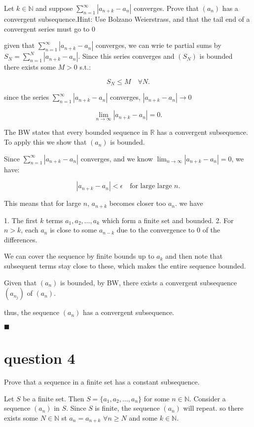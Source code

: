 \documentclass{article}
\begin{document}
Let $k \in \mathbb{N}$ and suppose $\sum_{n=1}^{\infty} |a_{n+k} - a_n|$ converges. Prove that $(a_n)$ has a convergent subsequence.Hint: Use Bolzano Weierstrass,
and that the tail end of a convergent series must go to 0

given that $\sum_{n=1}^{\infty} |a_{n+k} - a_n|$ converges, we can wrie te partial sums by $S_N = \sum_{n=1}^{N} |a_{n+k} - a_n|$. Since this series converges and $(S_N)$ is bounded\\ there exists some $M > 0$ s.t.:

\[
S_N \leq M \quad \forall N.
\]

since the series $\sum_{n=1}^{\infty} |a_{n+k} - a_n|$ converges, $|a_{n+k} - a_n| \to 0$

\[
\lim_{n \to \infty} |a_{n+k} - a_n| = 0.
\]

The BW states that every bounded sequence in $\mathbb{R}$ has a convergent subsequence. To apply this we show that $(a_n)$ is bounded.

Since $\sum_{n=1}^{\infty} |a_{n+k} - a_n|$ converges, and we know $\lim_{n \to \infty} |a_{n+k} - a_n| = 0$, we have:

\[
|a_{n+k} - a_n| < \epsilon \quad \text{for large large } n.
\]

This means that for large $n$, $a_{n+k}$ becomes closer too $a_n$. we have  

1. The first $k$ terms $a_1, a_2, \ldots, a_k$ which form a finite set and bounded.
2. For $n > k$, each $a_n$ is close to some $a_{n-k}$ due to the convergence to 0 of the differences.

We can cover the sequence by finite bounds up to $a_k$ and then note that subsequent terms stay close to these, which makes the entire sequence bounded.

Given that $(a_n)$ is bounded, by BW, there exists a convergent subsequence $(a_{n_j})$ of $(a_n)$.

thus, the sequence $(a_n)$ has a convergent subsequence.

\hfill $\blacksquare$

\section{question 4}
Prove that a sequence in a finite set has a constant subsequence.

Let $S$ be a finite set. Then $S = \{a_1, a_2, \ldots, a_n\}$ for some $n \in \mathbb{N}$. Consider a sequence $(a_n)$ in $S$. Since $S$ is finite, the sequence $(a_n)$ will repeat. so there exists some $N \in \mathbb{N}$ st $a_n = a_{n+k}$  $\forall n \geq N$ and some $k \in \mathbb{N}$.
\end{document}
